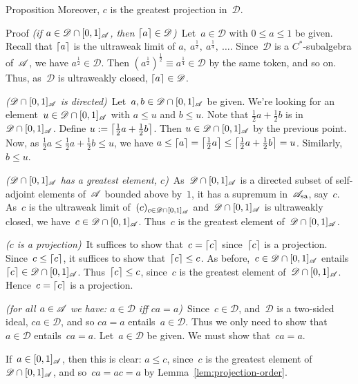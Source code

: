 \documentclass[main]{subfiles}
\begin{document}
\begin{parsec}
\begin{point}{Proposition}
Moreover, $c$ is the greatest projection in~$\mathscr{D}$.
\begin{point}{Proof}%
\emph{(if $a\in \mathscr{D}\cap [0,1]_{\mathscr{A}}$, 
then $\left\lceil a\right\rceil\in\mathscr{D}$)}\ 
Let~$a\in\mathscr{D}$ with $0\leq a \leq 1$
be given.
Recall that $\left\lceil a\right\rceil$
is the ultraweak limit of $a,\ a^{\frac{1}{2}},\ a^{\frac{1}{4}},\ \dotsc$.
Since~$\mathscr{D}$ is a $C^*$-subalgebra of~$\mathscr{A}$,
we have $a^{\frac{1}{2}}\in \mathscr{D}$.
Then $(a^{\frac{1}{2}})^{\frac{1}{2}} \equiv a^{\frac{1}{4}}\in \mathscr{D}$
by the same token,
and so on.
Thus, as~$\mathscr{D}$ is ultraweakly closed, $\left\lceil a\right\rceil\in\mathscr{D}$.

\emph{($\mathscr{D}\cap [0,1]_{\mathscr{A}}$ is directed)}\ 
Let~$a,b\in \mathscr{D}\cap[0,1]_{\mathscr{A}}$ be given.
We're looking for an element~$u\in \mathscr{D}\cap[0,1]_{\mathscr{A}}$
with $a\leq u$ and $b\leq u$.
Note that $\frac{1}{2}a + \frac{1}{2}b$
is in~$\mathscr{D}\cap[0,1]_{\mathscr{A}}$.
Define
$u:=\left\lceil\frac{1}{2}a+\frac{1}{2}b\right\rceil$.
Then  $u\in \mathscr{D}\cap[0,1]_{\mathscr{A}}$
by the previous point.
Now, 
as $\frac{1}{2}a \leq \frac{1}{2}a+\frac{1}{2}b \leq u$,
we have $a \leq \left\lceil a\right\rceil =\left\lceil\frac{1}{2}a\right\rceil \leq 
\left\lceil \frac{1}{2}a+\frac{1}{2}b\right\rceil = u$.
Similarly, $b\leq u$.


\emph{($\mathscr{D}\cap [0,1]_{\mathscr{A}}$
has a greatest element, $c$)}\ 
As~$\mathscr{D}\cap[0,1]_{\mathscr{A}}$
is a directed subset of self-adjoint elements 
of~$\mathscr{A}$ bounded above by~$1$,
it has a supremum in~$\mathscr{A}_\mathrm{sa}$,
say~$c$.
As~$c$ is the ultraweak limit of~$(c)_{c\in \mathscr{D}\cap[0,1]_{\mathscr{A}}}$
and~$\mathscr{D}\cap[0,1]_{\mathscr{A}}$ is ultraweakly closed,
we have~$c\in \mathscr{D}\cap[0,1]_{\mathscr{A}}$.
Thus~$c$ is the greatest element of~$\mathscr{D}\cap[0,1]_{\mathscr{A}}$.

\emph{($c$ is a projection)}\ 
It suffices to show that~$c=\left\lceil c\right\rceil$ since~$\left\lceil c\right\rceil$ is a projection.
Since~$c\leq \left\lceil c\right\rceil$, it suffices to show that~$\left\lceil c\right\rceil\leq c$.
As before,~$c\in \mathscr{D}\cap[0,1]_{\mathscr{A}}$
entails~$\left\lceil c\right\rceil\in\mathscr{D}\cap[0,1]_{\mathscr{A}}$.
Thus~$\left\lceil c\right\rceil\leq c$, since~$c$ is the
greatest element of~$\mathscr{D}\cap[0,1]_{\mathscr{A}}$.
Hence~$c=\left\lceil c\right\rceil$ is a projection.

\emph{(for all $a\in \mathscr{A}$
we have: $a\in \mathscr{D}$ iff $ca=a$)}\ 
Since~$c\in \mathscr{D}$,
and~$\mathscr{D}$ is a two-sided ideal,
$ca\in \mathscr{D}$, and so $ca=a$ entails~$a\in\mathscr{D}$.
Thus we only need to show that~$a\in\mathscr{D}$
entails~$ca=a$.
Let~$a\in\mathscr{D}$
be given.
We must show that~$ca=a$.

If~$a\in [0,1]_{\mathscr{A}}$,
then this is clear:
$a\leq c$, since~$c$ is the greatest element
of~$\mathscr{D}\cap [0,1]_{\mathscr{A}}$,
and so~$ca=ac=a$ by Lemma~\ref{lem:projection-order}.


\end{point}
\end{point}
\end{parsec}
\end{document}
